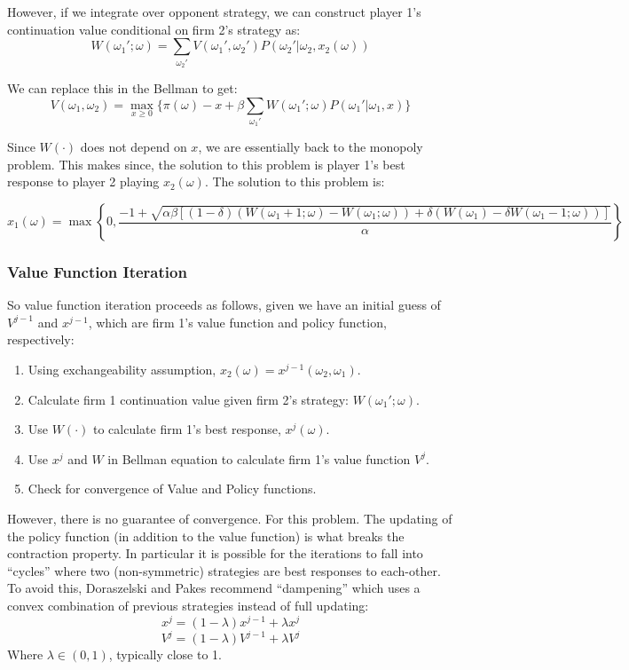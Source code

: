 \documentclass[twoside]{article}
\begin{document}
However, if we integrate over opponent strategy, we can construct player 1's continuation value conditional on firm 2's strategy as:  
$$ W(\omega_1'; \omega) = \sum_{\omega_2'} V(\omega_1', \omega_2') P(\omega_2' | \omega_2, x_2(\omega)) $$

We can replace this in the Bellman to get: 
$$V(\omega_1, \omega_2) = \max_{x \geq 0} \bigg\{ \pi(\omega) - x + \beta \sum_{\omega_1'} W(\omega_1'; \omega) P(\omega_1'| \omega_1, x)  \bigg\}$$

Since $W(\cdot)$ does not depend on $x$, we are essentially back to the monopoly problem.  This makes since, the solution to this problem is player 1's 
best response to player 2 playing $x_2(\omega)$.  The solution to this problem is: 

 $$x_1(\omega) =  \max\left\{0, \frac{-1 + \sqrt{\alpha \beta \left[ (1 - \delta) (W(\omega_1 + 1; \omega) - W(\omega_1; \omega)) + \delta(W(\omega_1) - \delta W(\omega_1 - 1; \omega)) \right] } }{\alpha} \right\} $$

\subsubsection{Value Function Iteration}

So value function iteration proceeds as follows, given we have an initial guess of $V^{j-1}$ and $x^{j-1}$, which are firm 1's value function and policy
function, respectively: 
\begin{enumerate}
\item Using exchangeability assumption, $x_2(\omega) = x^{j-1}(\omega_2, \omega_1)$. 
\item Calculate firm 1 continuation value given firm 2's strategy: $W(\omega_1'; \omega)$. 
\item Use $W(\cdot)$ to calculate firm 1's best response, $x^j(\omega)$.
\item Use $x^j$ and $W$ in Bellman equation to calculate firm 1's value function $V^{j}$. 
\item Check for convergence of Value and Policy functions.
\end{enumerate}

However, there is no guarantee of convergence. For this problem. The updating of the policy function (in addition to the value function) is what
breaks the contraction property. In particular it is possible for the iterations to fall into ``cycles'' where two (non-symmetric) strategies are best responses to each-other. To avoid this, Doraszelski and Pakes recommend ``dampening'' which uses a convex combination of previous strategies instead of full updating: 
$$ x^j = (1-\lambda)x^{j-1} + \lambda x^j $$
$$ V^j = (1- \lambda) V^{j-1} + \lambda V^j$$
Where $\lambda \in (0, 1)$, typically close to 1. 
\end{document}
